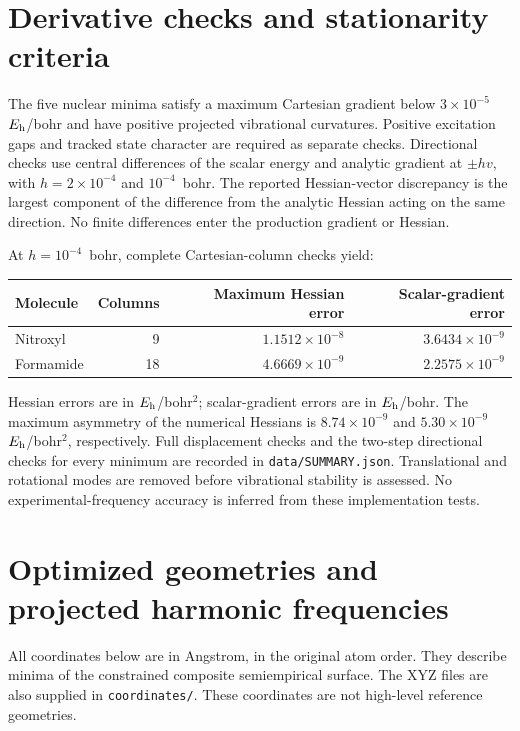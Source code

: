\documentclass[11pt,a4paper]{article}
\newcommand{\Eh}{\ensuremath{E_{\rm h}}}
\begin{document}


\section{Derivative checks and stationarity criteria}
The five nuclear minima satisfy a maximum Cartesian gradient below $3\times10^{-5}$~\Eh/bohr and have positive projected vibrational curvatures. Positive excitation gaps and tracked state character are required as separate checks. Directional checks use central differences of the scalar energy and analytic gradient at $\pm h v$, with $h=2\times10^{-4}$ and $10^{-4}$~bohr. The reported Hessian-vector discrepancy is the largest component of the difference from the analytic Hessian acting on the same direction. No finite differences enter the production gradient or Hessian.

At $h=10^{-4}$~bohr, complete Cartesian-column checks yield:
\begin{center}
\begin{tabular}{lrrr}
\toprule
Molecule & Columns & Maximum Hessian error & Scalar-gradient error\\
\midrule
Nitroxyl & 9 & $1.1512\times10^{-8}$ & $3.6434\times10^{-9}$\\
Formamide & 18 & $4.6669\times10^{-9}$ & $2.2575\times10^{-9}$\\
\bottomrule
\end{tabular}
\end{center}
Hessian errors are in \Eh/bohr$^2$; scalar-gradient errors are in \Eh/bohr. The maximum asymmetry of the numerical Hessians is $8.74\times10^{-9}$ and $5.30\times10^{-9}$~\Eh/bohr$^2$, respectively. Full displacement checks and the two-step directional checks for every minimum are recorded in \texttt{data/SUMMARY.json}. Translational and rotational modes are removed before vibrational stability is assessed. No experimental-frequency accuracy is inferred from these implementation tests.

\clearpage
\section{Optimized geometries and projected harmonic frequencies}
All coordinates below are in Angstrom, in the original atom order. They describe minima of the constrained composite semiempirical surface. The XYZ files are also supplied in \texttt{coordinates/}. These coordinates are not high-level reference geometries.

\end{document}
